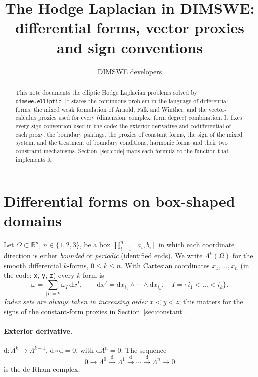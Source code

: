 \documentclass[11pt]{article}
\title{The Hodge Laplacian in DIMSWE:\\ differential forms, vector proxies and sign conventions}
\author{DIMSWE developers}
\date{}
\newcommand{\dd}{\mathrm{d}}
\newcommand{\R}{\mathbb{R}}
\newcommand{\code}[1]{\texttt{#1}}
\theoremstyle{remark}
\begin{document}
\maketitle

\begin{abstract}
This note documents the elliptic Hodge Laplacian problems solved by \code{dimswe.elliptic}.
It states the continuous problem in the language of differential forms, the mixed weak
formulation of Arnold, Falk and Winther, and the vector-calculus proxies used for every
(dimension, complex, form degree) combination. It fixes every sign convention used in the code:
the exterior derivative and codifferential of each proxy, the boundary pairings, the proxies of
constant forms, the sign of the mixed system, and the treatment of boundary conditions, harmonic
forms and their two constraint mechanisms. Section~\ref{sec:code} maps each formula to the
function that implements it.
\end{abstract}

\tableofcontents

\section{Differential forms on box-shaped domains}

Let $\Omega\subset\R^n$, $n\in\{1,2,3\}$, be a box $\prod_{i=1}^n [a_i,b_i]$ in which each
coordinate direction is either \emph{bounded} or \emph{periodic} (identified ends). We write
$\Lambda^k(\Omega)$ for the smooth differential $k$-forms, $0\le k\le n$. With Cartesian
coordinates $x_1,\dots,x_n$ (in the code: \code{x}, \code{y}, \code{z}) every $k$-form is
\[
  \omega = \sum_{|I|=k} \omega_I \, \dd x^I, \qquad
  \dd x^I = \dd x_{i_1}\wedge\cdots\wedge\dd x_{i_k}, \quad I=\{i_1<\dots<i_k\}.
\]
\emph{Index sets are always taken in increasing order} $x<y<z$; this matters for the signs of
the constant-form proxies in Section~\ref{sec:constant}.

\paragraph{Exterior derivative.} $\dd:\Lambda^k\to\Lambda^{k+1}$, $\dd\circ\dd=0$, with
$\dd\Lambda^n=0$. The sequence
\[
  0 \to \Lambda^0 \xrightarrow{\dd} \Lambda^1 \xrightarrow{\dd} \cdots \xrightarrow{\dd} \Lambda^n \to 0
\]
is the de Rham complex.
\end{document}
